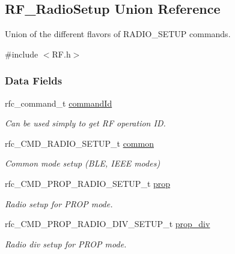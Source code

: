 \subsection{R\+F\+\_\+\+Radio\+Setup Union Reference}
\label{union_r_f___radio_setup}


Union of the different flavors of R\+A\+D\+I\+O\+\_\+\+S\+E\+T\+U\+P commands.  




{\ttfamily \#include $<$R\+F.\+h$>$}

\subsubsection*{Data Fields}
\begin{DoxyCompactItemize}
\item 
rfc\+\_\+command\+\_\+t \hyperlink{union_r_f___radio_setup_a7849a5bb5dc28c798cc55793f6c347dd}{command\+Id}
\begin{DoxyCompactList}\small\item\em Can be used simply to get R\+F operation I\+D. \end{DoxyCompactList}\item 
rfc\+\_\+\+C\+M\+D\+\_\+\+R\+A\+D\+I\+O\+\_\+\+S\+E\+T\+U\+P\+\_\+t \hyperlink{union_r_f___radio_setup_afd03d9690df15d5cca3e82c4ff25ba58}{common}
\begin{DoxyCompactList}\small\item\em Common mode setup (B\+L\+E, I\+E\+E\+E modes) \end{DoxyCompactList}\item 
rfc\+\_\+\+C\+M\+D\+\_\+\+P\+R\+O\+P\+\_\+\+R\+A\+D\+I\+O\+\_\+\+S\+E\+T\+U\+P\+\_\+t \hyperlink{union_r_f___radio_setup_afd693ac0735adf77800aa285124bd03a}{prop}
\begin{DoxyCompactList}\small\item\em Radio setup for P\+R\+O\+P mode. \end{DoxyCompactList}\item 
rfc\+\_\+\+C\+M\+D\+\_\+\+P\+R\+O\+P\+\_\+\+R\+A\+D\+I\+O\+\_\+\+D\+I\+V\+\_\+\+S\+E\+T\+U\+P\+\_\+t \hyperlink{union_r_f___radio_setup_ae5b63db8408d7cd3cc773f7c38ea0545}{prop\+\_\+div}
\begin{DoxyCompactList}\small\item\em Radio div setup for P\+R\+O\+P mode. \end{DoxyCompactList}\end{DoxyCompactItemize}


